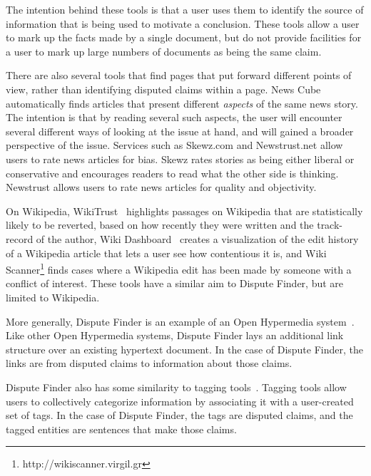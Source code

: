\documentclass{www2010-submission}
\newcommand{\todo}[1]{}
\begin{document}
The intention behind these tools is that a user uses them to identify the source of information that is being used to motivate a conclusion. These tools allow a user to mark up the facts made by a single document, but do not provide facilities for a user to mark up large numbers of documents as being the same claim. 

There are also several tools that find pages that put forward different points of view, rather than identifying disputed claims within a page. News Cube~\cite{Park2009} automatically finds articles that present different {\it aspects} of the same news story. The intention is that by reading several such aspects, the user will encounter several different ways of looking at the issue at hand, and will gained a broader perspective of the issue. 
Services such as Skewz.com and Newstrust.net allow users to rate news articles for bias. Skewz rates stories as being either liberal or conservative and encourages readers to read what the other side is thinking. Newstrust allows users to rate news articles for quality and objectivity. 

On Wikipedia, WikiTrust~\cite{Adler2008a} highlights passages on Wikipedia that are statistically likely to be reverted, based on how recently they were written and the track-record of the author, Wiki Dashboard~\cite{Kittur2008} creates a visualization of the edit history of a Wikipedia article that lets a user see how contentious it is, and Wiki Scanner\footnote{http://wikiscanner.virgil.gr} finds cases where a Wikipedia edit has been made by someone with a conflict of interest. These tools have a similar aim to Dispute Finder, but are limited to Wikipedia.

More generally, Dispute Finder is an example of an Open Hypermedia system~\cite{Bouvin2000,Wiil1996}. Like other Open Hypermedia systems, Dispute Finder lays an additional link structure over an existing hypertext document. In the case of Dispute Finder, the links are from disputed claims to information about those claims.

Dispute Finder also has some similarity to tagging tools~\cite{Marlow2006,Golder2006}. Tagging tools allow users to collectively categorize information by associating it with a user-created set of tags. In the case of Dispute Finder, the tags are disputed claims, and the tagged entities are sentences that make those claims.


\todo{Improve the paraphraser UI so it shows users what pages are making the claim}
\todo{Improve the ``see examples on the web'' UI to it shows the pages that were found with the activists training work}
\todo{Provide a customized RSS reader and search engine that does dispute tracking. - future work?}
\todo{Should we explicitly list what we think are our key contributions?}
\end{document}
